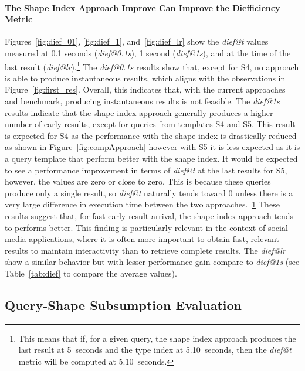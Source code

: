 \paragraph{The Shape Index Approach Improve Can Improve the Diefficiency Metric}
Figures~\ref{fig:dief_01}, \ref{fig:dief_1}, and~\ref{fig:dief_lr} show the \textit{dief@t} values measured at 0.1 seconds (\textit{dief@0.1s}), 1 second (\textit{dief@1s}), and at the time of the last result (\textit{dief@lr}).\footnote{\label{fn:dief_lt}This means that if, for a given query, the shape index approach produces the last result at 5~seconds and the type index at 5.10~seconds, then the \textit{dief@t} metric will be computed at 5.10~seconds.}  
The \textit{dief@0.1s} results show that, except for S4, no approach is able to produce instantaneous results, which aligns with the observations in Figure~\ref{fig:first_res}.  
Overall, this indicates that, with the current approaches and benchmark, producing instantaneous results is not feasible.
The \textit{dief@1s} results indicate that the shape index approach generally produces a higher number of early results, except for queries from templates S4 and S5.
This result is expected for S4 as the performance with the shape index is drastically reduced as shown in Figure~\ref{fig:compApproach} however with S5 it is less expected as it is a query template that perform better with the shape index.
It would be expected to see a performance improvement in terms of \textit{dief@t} at the last results for S5, however, the values are zero or close to zero.
This is because these queries produce only a single result, so \textit{dief@t} naturally tends toward 0 unless there is a very large difference in execution time between the two approaches.~\ref{fn:dief_lt}
These results suggest that, for fast early result arrival, the shape index approach tends to performs better.
This finding is particularly relevant in the context of social media applications, where it is often more important to obtain fast, relevant results to maintain interactivity than to retrieve complete results.  
The \textit{dief@lr} show a similar behavior but with lesser performance gain compare to \textit{dief@1s} (see Table~\ref{tab:dief} to compare the average values).


\subsection{Query-Shape Subsumption Evaluation} \label{sec:experimentAlgoSubsumption}


